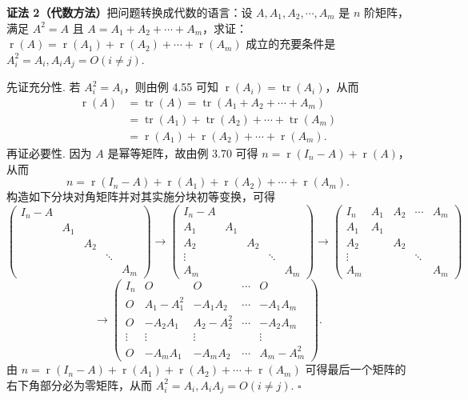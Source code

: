 \documentclass[UTF8,12pt,a4paper,fontset=fandol]{ctexart}
\begin{document}
\noindent\textbf{证法 2（代数方法）}\quad 把问题转换成代数的语言：设 $A,A_1,A_2,\cdots,A_m$ 是 $n$ 阶矩阵，满足 $A^2=A$ 且 $A=A_1+A_2+\cdots+A_m$，求证：$\operatorname{r}(A)=\operatorname{r}(A_1)+\operatorname{r}(A_2)+\cdots+\operatorname{r}(A_m)$ 成立的充要条件是 $A_i^2=A_i,A_iA_j=O(i\ne j)$.

先证充分性. 若 $A_i^2=A_i$，则由例 4.55 可知 $\operatorname{r}(A_i)=\operatorname{tr}(A_i)$，从而
\[
\begin{aligned}
\operatorname{r}(A)
&=\operatorname{tr}(A)=\operatorname{tr}(A_1+A_2+\cdots+A_m)\\
&=\operatorname{tr}(A_1)+\operatorname{tr}(A_2)+\cdots+\operatorname{tr}(A_m)\\
&=\operatorname{r}(A_1)+\operatorname{r}(A_2)+\cdots+\operatorname{r}(A_m).
\end{aligned}
\]
再证必要性. 因为 $A$ 是幂等矩阵，故由例 3.70 可得 $n=\operatorname{r}(I_n-A)+\operatorname{r}(A)$，从而
\[
n=\operatorname{r}(I_n-A)+\operatorname{r}(A_1)+\operatorname{r}(A_2)+\cdots+\operatorname{r}(A_m).
\]
构造如下分块对角矩阵并对其实施分块初等变换，可得
\[
\left(\begin{array}{ccccc}
I_n-A &        &        &        & \\
      & A_1    &        &        & \\
      &        & A_2    &        & \\
      &        &        & \ddots & \\
      &        &        &        & A_m
\end{array}\right)
\to
\left(\begin{array}{ccccc}
I_n-A &        &        &        & \\
A_1   & A_1    &        &        & \\
A_2   &        & A_2    &        & \\
\vdots&        &        & \ddots & \\
A_m   &        &        &        & A_m
\end{array}\right)
\to
\left(\begin{array}{ccccc}
I_n & A_1 & A_2 & \cdots & A_m\\
A_1 & A_1 &     &        & \\
A_2 &     & A_2 &        & \\
\vdots &  &     & \ddots & \\
A_m &    &     &        & A_m
\end{array}\right)
\]
\[
\to
\left(\begin{array}{ccccc}
I_n & O & O & \cdots & O\\
O & A_1-A_1^2 & -A_1A_2 & \cdots & -A_1A_m\\
O & -A_2A_1 & A_2-A_2^2 & \cdots & -A_2A_m\\
\vdots & \vdots & \vdots &        & \vdots\\
O & -A_mA_1 & -A_mA_2 & \cdots & A_m-A_m^2
\end{array}\right).
\]
由 $n=\operatorname{r}(I_n-A)+\operatorname{r}(A_1)+\operatorname{r}(A_2)+\cdots+\operatorname{r}(A_m)$ 可得最后一个矩阵的右下角部分必为零矩阵，从而 $A_i^2=A_i,A_iA_j=O(i\ne j)$. $\square$
\end{document}
